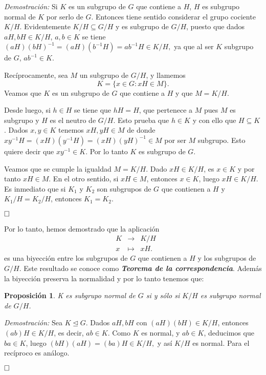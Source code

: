 \documentclass[12pt]{article}
\newtheorem{proposition}[theorem]{Proposición}
\begin{document}
\emph{Demostración: }Si $K$ es un subgrupo de $G$ que contiene a $H$, $H$ es subgrupo normal de $K$ por serlo de $G$. Entonces tiene sentido considerar el grupo cociente $K/H$. Evidentemente $K/H \subseteq G/H$ y es subgrupo de $G/H$, puesto que dados $aH, bH \in K/H$, $a,b \in K$ se tiene $(aH)(bH)^{-1} = (aH)(b^{-1}H) = ab^{-1}H \in K/H,$ ya que al ser $K$ subgrupo de $G$, $ab^{-1} \in K$.

Recíprocamente, sea $M$ un subgrupo de $G/H$, y llamemos $$K = \lbrace x \in G : xH \in M \rbrace.$$ Veamos que $K$ es un subgrupo de $G$ que contiene a $H$ y que $M = K/H$.

Desde luego, si $h \in H$ se tiene que $hH = H$, que pertenece a $M$ pues $M$ es subgrupo y $H$ es el neutro de $G/H$. Esto prueba que $h \in K$ y con ello que $H \subseteq K$. Dados $x,y \in K$ tenemos $xH, yH \in M$ de donde $xy^{-1}H = (xH)(y^{-1}H) = (xH)(yH)^{-1} \in M$ por ser $M$ subgrupo. Esto quiere decir que $xy^{-1} \in K$. Por lo tanto $K$ es subgrupo de $G$.

Veamos que se cumple la igualdad $M = K/H$. Dado $xH \in K/H$, es $x \in K$ y por tanto $xH \in M$. En el otro sentido, si $xH \in M$, entonces $x \in K$, luego $xH \in K/H$. Es inmediato que si $K_{1}$ y $K_{2}$ son subgrupos de $G$ que contienen a $H$ y $K_{1}/H = K_{2}/H$, entonces $K_{1} = K_{2}$.

$\hfill \square$

Por lo tanto, hemos demostrado que la aplicación $$\begin{array}{rccl}
&K & \longrightarrow & K/H\\
&x & \longmapsto &xH.
\end{array}
$$ es una biyección entre los subgrupos de $G$ que contienen a $H$ y los subgrupos de $G/H$. Este resultado se conoce como \textbf{\textit{Teorema de la correspondencia}}. Además la biyección preserva la normalidad y por lo tanto tenemos que: \begin{proposition} K es subgrupo normal de $G$ si y sólo si $K/H$ es subgrupo normal de $G/H$.\end{proposition}

\emph{Demostración: }Sea $K \unlhd G$. Dados $aH, bH$ con $(aH)(bH) \in K/H$, entonces $(ab)H \in K/H$, es decir, $ab \in K$. Como $K$ es normal, y $ab \in K$, deducimos que $ba \in K$, luego $(bH)(aH) = (ba)H \in K/H,$ y así $K/H$ es normal. Para el recíproco es análogo.

$\hfill \square$
\end{document}
